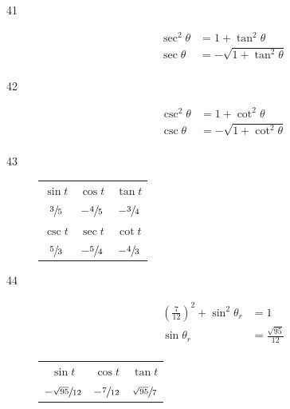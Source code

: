 \documentclass{exam}
\begin{document}
\begin{description}
      \item[41]
        \begin{align*}
          \sec^2 \theta & = 1 + \tan^2 \theta \\
          \sec \theta   & = \boxed{ - \sqrt{ 1 + \tan^2 \theta } } \\
        \end{align*}

      \item[42]
        \begin{align*}
          \csc^2 \theta & = 1 + \cot^2 \theta \\
          \csc \theta   & = \boxed{ - \sqrt{ 1 + \cot^2 \theta } } \\
        \end{align*}

      \item[43]
        \begin{tabular}[H]{ccc}
          \toprule

          $\sin t$       & $\cos t$         & $\tan t$        \\
          $\sfrac{3}{5}$ & $- \sfrac{4}{5}$ & $- \sfrac{3}{4}$ \\

          \midrule

          $\csc t$       & $\sec t$         & $\cot t$ \\
          $\sfrac{5}{3}$ & $- \sfrac{5}{4}$ & $- \sfrac{4}{3}$ \\

          \bottomrule
        \end{tabular}

      \item[44]
        \begin{align*}
          \left( \frac{7}{12} \right)^2 + \sin^2 \theta_r & = 1 \\
          \sin \theta_r                                   & = \frac{\sqrt{95}}{12} \\
        \end{align*}

        \begin{tabular}[H]{ccc}
          \toprule

          $\sin t$                 & $\cos t$         & $\tan t$              \\
          $-\sfrac{\sqrt{95}}{12}$ & $-\sfrac{7}{12}$ & $\sfrac{\sqrt{95}}{7}$ \\

          \midrule


\end{tabular}
\end{description}
\end{document}
